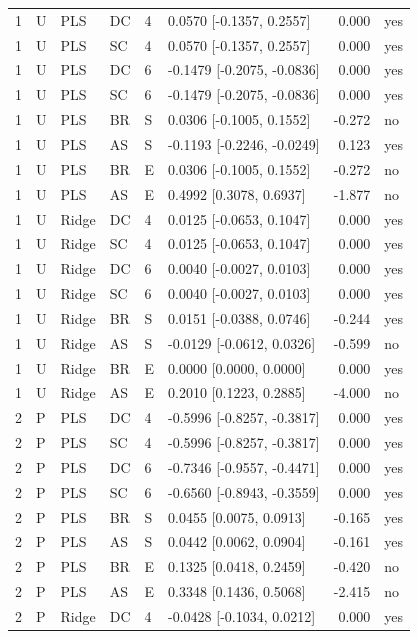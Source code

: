 \documentclass[10pt,a4paper]{article}
\begin{document}
\begin{longtable}{rlllllrl}
1 & U & PLS & DC & 4 & 0.0570 [-0.1357, 0.2557] & 0.000 & yes \\
1 & U & PLS & SC & 4 & 0.0570 [-0.1357, 0.2557] & 0.000 & yes \\
1 & U & PLS & DC & 6 & -0.1479 [-0.2075, -0.0836] & 0.000 & yes \\
1 & U & PLS & SC & 6 & -0.1479 [-0.2075, -0.0836] & 0.000 & yes \\
1 & U & PLS & BR & S & 0.0306 [-0.1005, 0.1552] & -0.272 & no \\
1 & U & PLS & AS & S & -0.1193 [-0.2246, -0.0249] & 0.123 & yes \\
1 & U & PLS & BR & E & 0.0306 [-0.1005, 0.1552] & -0.272 & no \\
1 & U & PLS & AS & E & 0.4992 [0.3078, 0.6937] & -1.877 & no \\
1 & U & Ridge & DC & 4 & 0.0125 [-0.0653, 0.1047] & 0.000 & yes \\
1 & U & Ridge & SC & 4 & 0.0125 [-0.0653, 0.1047] & 0.000 & yes \\
1 & U & Ridge & DC & 6 & 0.0040 [-0.0027, 0.0103] & 0.000 & yes \\
1 & U & Ridge & SC & 6 & 0.0040 [-0.0027, 0.0103] & 0.000 & yes \\
1 & U & Ridge & BR & S & 0.0151 [-0.0388, 0.0746] & -0.244 & yes \\
1 & U & Ridge & AS & S & -0.0129 [-0.0612, 0.0326] & -0.599 & no \\
1 & U & Ridge & BR & E & 0.0000 [0.0000, 0.0000] & 0.000 & yes \\
1 & U & Ridge & AS & E & 0.2010 [0.1223, 0.2885] & -4.000 & no \\
2 & P & PLS & DC & 4 & -0.5996 [-0.8257, -0.3817] & 0.000 & yes \\
2 & P & PLS & SC & 4 & -0.5996 [-0.8257, -0.3817] & 0.000 & yes \\
2 & P & PLS & DC & 6 & -0.7346 [-0.9557, -0.4471] & 0.000 & yes \\
2 & P & PLS & SC & 6 & -0.6560 [-0.8943, -0.3559] & 0.000 & yes \\
2 & P & PLS & BR & S & 0.0455 [0.0075, 0.0913] & -0.165 & yes \\
2 & P & PLS & AS & S & 0.0442 [0.0062, 0.0904] & -0.161 & yes \\
2 & P & PLS & BR & E & 0.1325 [0.0418, 0.2459] & -0.420 & no \\
2 & P & PLS & AS & E & 0.3348 [0.1436, 0.5068] & -2.415 & no \\
2 & P & Ridge & DC & 4 & -0.0428 [-0.1034, 0.0212] & 0.000 & yes \\

\end{longtable}
\end{document}
